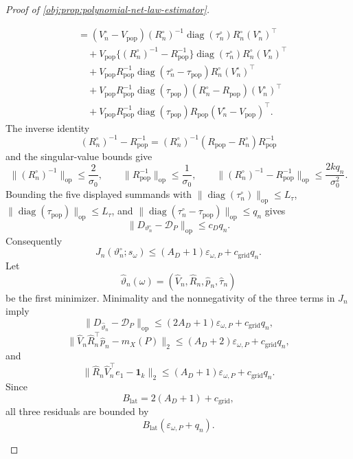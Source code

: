 \documentclass[11pt]{article}
\begin{document}
\begin{proof}[Proof of \cref{obj:prop:polynomial-net-law-estimator}]
\begin{enumerate}
\[\begin{aligned}
&=(V_n^\circ-V_{\mathrm{pop}})(R_n^\circ)^{-1}\operatorname{diag}(\tau_n^\circ)R_n^\circ(V_n^\circ)^\top\\
&\quad+V_{\mathrm{pop}}\{(R_n^\circ)^{-1}-R_{\mathrm{pop}}^{-1}\}\operatorname{diag}(\tau_n^\circ)R_n^\circ(V_n^\circ)^\top\\
&\quad+V_{\mathrm{pop}}R_{\mathrm{pop}}^{-1}\operatorname{diag}(\tau_n^\circ-\tau_{\mathrm{pop}})R_n^\circ(V_n^\circ)^\top\\
&\quad+V_{\mathrm{pop}}R_{\mathrm{pop}}^{-1}\operatorname{diag}(\tau_{\mathrm{pop}})(R_n^\circ-R_{\mathrm{pop}})(V_n^\circ)^\top\\
&\quad+V_{\mathrm{pop}}R_{\mathrm{pop}}^{-1}\operatorname{diag}(\tau_{\mathrm{pop}})R_{\mathrm{pop}}(V_n^\circ-V_{\mathrm{pop}})^\top .
\end{aligned}
\]
The inverse identity
\[
(R_n^\circ)^{-1}-R_{\mathrm{pop}}^{-1}
=
(R_n^\circ)^{-1}(R_{\mathrm{pop}}-R_n^\circ)R_{\mathrm{pop}}^{-1}
\]
and the singular-value bounds give
\[
\|(R_n^\circ)^{-1}\|_{\mathrm{op}}\le\frac{2}{\sigma_0},
\qquad
\|R_{\mathrm{pop}}^{-1}\|_{\mathrm{op}}\le\frac1{\sigma_0},
\qquad
\|(R_n^\circ)^{-1}-R_{\mathrm{pop}}^{-1}\|_{\mathrm{op}}
\le\frac{2kq_n}{\sigma_0^2}.
\]
Bounding the five displayed summands with
\(\|\operatorname{diag}(\tau_n^\circ)\|_{\mathrm{op}}\le L_\tau\),
\(\|\operatorname{diag}(\tau_{\mathrm{pop}})\|_{\mathrm{op}}\le L_\tau\), and
\(\|\operatorname{diag}(\tau_n^\circ-\tau_{\mathrm{pop}})\|_{\mathrm{op}}\le q_n\)
gives
\[
\|D_{\vartheta_n^\circ}-\mathcal D_P\|_{\mathrm{op}}\le c_Dq_n.
\]
Consequently
\[
J_n(\vartheta_n^\circ;s_\omega)
\le
(A_D+1)\varepsilon_{\omega,P}+c_{\mathrm{grid}}q_n .
\]
Let
\[
\widehat\vartheta_n(\omega)
=(\widehat V_n,\widehat R_n,\widehat p_n,\widehat\tau_n)
\]
be the first minimizer.  Minimality and the nonnegativity of the three terms in \(J_n\) imply
\[
\|D_{\widehat\vartheta_n}-\mathcal D_P\|_{\mathrm{op}}
\le(2A_D+1)\varepsilon_{\omega,P}+c_{\mathrm{grid}}q_n,
\]
\[
\|\widehat V_n\widehat R_n^\top\widehat p_n-m_X(P)\|_2
\le(A_D+2)\varepsilon_{\omega,P}+c_{\mathrm{grid}}q_n,
\]
and
\[
\|\widehat R_n\widehat V_n^\top e_1-\mathbf1_k\|_2
\le(A_D+1)\varepsilon_{\omega,P}+c_{\mathrm{grid}}q_n.
\]
Since
\[
B_{\mathrm{lat}}=2(A_D+1)+c_{\mathrm{grid}},
\]
all three residuals are bounded by
\[
B_{\mathrm{lat}}(\varepsilon_{\omega,P}+q_n).
\] %


\end{enumerate}
\end{proof}
\end{document}
